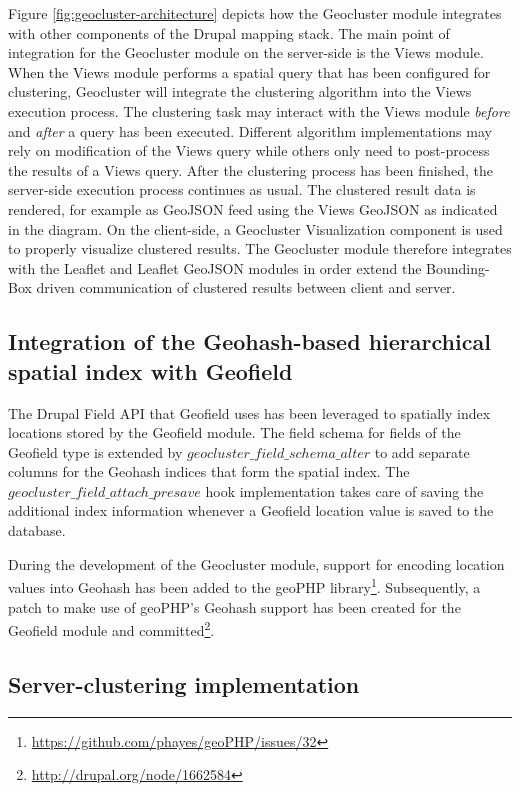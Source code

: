 Figure \ref{fig:geocluster-architecture} depicts how the Geocluster module integrates with other components of the Drupal mapping stack. The main point of integration for the Geocluster module on the server-side is the Views module. When the Views module performs a spatial query that has been configured for clustering, Geocluster will integrate the clustering algorithm into the Views execution process. The clustering task may interact with the Views module \textit{before} and \textit{after} a query has been executed. Different algorithm implementations may rely on modification of the Views query while others only need to post-process the results of a Views query. After the clustering process has been finished, the server-side execution process continues as usual. The clustered result data is rendered, for example as GeoJSON feed using the Views GeoJSON as indicated in the diagram. On the client-side, a Geocluster Visualization component is used to properly visualize clustered results. The Geocluster module therefore integrates with the Leaflet and Leaflet GeoJSON modules in order extend the Bounding-Box driven communication of clustered results between client and server.


\subsection{Integration of the Geohash-based hierarchical spatial index with Geofield}

The Drupal Field API that Geofield uses has been leveraged to spatially index locations stored by the Geofield module. The field schema for fields of the Geofield type is extended by $geocluster\_field\_schema\_alter$ to add separate columns for the Geohash indices that form the spatial index. The $geocluster\_field\_attach\_presave$ hook implementation takes care of saving the additional index information whenever a Geofield location value is saved to the database.

During the development of the Geocluster module, support for encoding location values into Geohash has been added to the geoPHP library\footnote{\url{https://github.com/phayes/geoPHP/issues/32}}. Subsequently, a patch to make use of geoPHP's Geohash support has been created for the Geofield module and committed\footnote{\url{http://drupal.org/node/1662584}}. 


\subsection{Server-clustering implementation}

